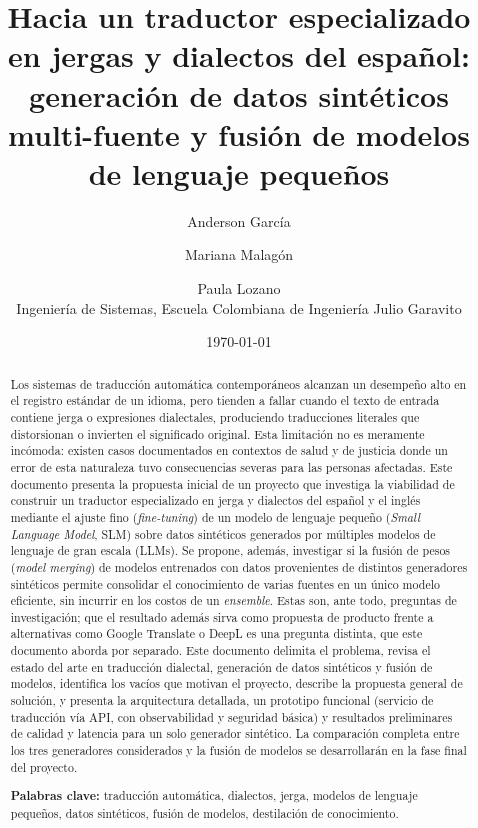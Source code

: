 \documentclass[11pt,a4paper]{article}
\title{\vspace{-1cm}Hacia un traductor especializado en jergas y dialectos del español: generación de datos sintéticos multi-fuente y fusión de modelos de lenguaje pequeños}
\author{
    Anderson García \and Mariana Malagón \and Paula Lozano \\[2mm]
    \small Ingeniería de Sistemas, Escuela Colombiana de Ingeniería Julio Garavito
}
\date{\today}
\begin{document}
\maketitle

\begin{abstract}
\noindent
Los sistemas de traducción automática contemporáneos alcanzan un desempeño alto en el registro estándar de un idioma, pero tienden a fallar cuando el texto de entrada contiene jerga o expresiones dialectales, produciendo traducciones literales que distorsionan o invierten el significado original. Esta limitación no es meramente incómoda: existen casos documentados en contextos de salud y de justicia donde un error de esta naturaleza tuvo consecuencias severas para las personas afectadas. Este documento presenta la propuesta inicial de un proyecto que investiga la viabilidad de construir un traductor especializado en jerga y dialectos del español y el inglés mediante el ajuste fino (\textit{fine-tuning}) de un modelo de lenguaje pequeño (\textit{Small Language Model}, SLM) sobre datos sintéticos generados por múltiples modelos de lenguaje de gran escala (LLMs). Se propone, además, investigar si la fusión de pesos (\textit{model merging}) de modelos entrenados con datos provenientes de distintos generadores sintéticos permite consolidar el conocimiento de varias fuentes en un único modelo eficiente, sin incurrir en los costos de un \textit{ensemble}. Estas son, ante todo, preguntas de investigación; que el resultado además sirva como propuesta de producto frente a alternativas como Google Translate o DeepL es una pregunta distinta, que este documento aborda por separado. Este documento delimita el problema, revisa el estado del arte en traducción dialectal, generación de datos sintéticos y fusión de modelos, identifica los vacíos que motivan el proyecto, describe la propuesta general de solución, y presenta la arquitectura detallada, un prototipo funcional (servicio de traducción vía API, con observabilidad y seguridad básica) y resultados preliminares de calidad y latencia para un solo generador sintético. La comparación completa entre los tres generadores considerados y la fusión de modelos se desarrollarán en la fase final del proyecto.

\vspace{2mm}
\noindent\textbf{Palabras clave:} traducción automática, dialectos, jerga, modelos de lenguaje pequeños, datos sintéticos, fusión de modelos, destilación de conocimiento.
\end{abstract}
\end{document}
